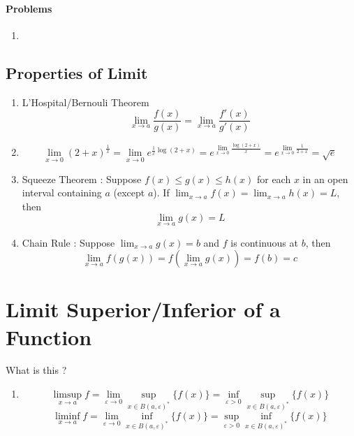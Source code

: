 \paragraph{Problems}
\begin{enumerate}
	\item
\end{enumerate}

\subsection{Properties of Limit}
\begin{enumerate}
	\item L'Hospital/Bernouli Theorem
	\[ \lim_{x \to a} \frac{f(x)}{g(x)} = \lim_{x \to a} \frac{f'(x)}{g'(x)} \]
	\item \[ \lim_{x \to 0} (2+x)^\frac{1}{x} = \lim_{x \to 0} e^{\frac{1}{x} \log (2+x)} = e^{\displaystyle \lim_{x \to 0} \frac{\log(2+x)}{x}} = e^{\displaystyle \lim_{x \to 0} \frac{1}{2+x}} = \sqrt{e} \]
	\item Squeeze Theorem :
	Suppose $f(x) \le g(x) \le h(x)$ for each $x$ in an open interval containing $a$ (except $a$).
	If $\displaystyle \lim_{x \to a} f(x) = \lim_{x \to a} h(x) = L$,  then
	\begin{equation}
		\lim_{x \to a} g(x) = L
		\label{equ:lim_squeeze}
	\end{equation}
	\item Chain Rule :
	Suppose $\displaystyle \lim_{x \to a} g(x) = b$ and $f$ is continuous at $b$, then
	\begin{equation}
		\lim_{x \to a} f(g(x)) = f(\lim_{x \to a} g(x)) = f(b) = c
	\end{equation}
\end{enumerate}
\section{Limit Superior/Inferior of a Function} What is this ?
\begin{enumerate}
	\item \[ \limsup_{x \to a} f = \lim_{\varepsilon \to 0} \sup_{x \in B(a,\varepsilon)^\ast} \{ f(x) \} = \inf_{\varepsilon > 0} \sup_{x \in B(a,\varepsilon)^\ast} \{ f(x) \} \]
	\[ \liminf_{x \to a} f = \lim_{\varepsilon \to 0} \inf_{x \in B(a,\varepsilon)^\ast} \{ f(x) \} = \sup_{\varepsilon > 0} \inf_{x \in B(a,\varepsilon)^\ast} \{ f(x) \} \]
\end{enumerate}
